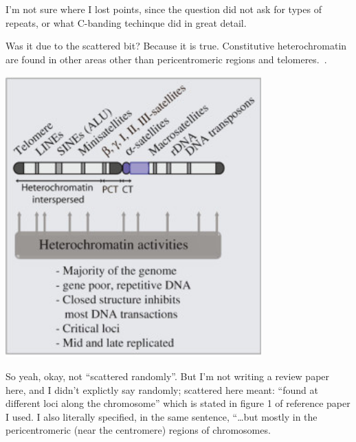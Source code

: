 \documentclass[basic,plain]{inVerba-notes}
\begin{document}
\begin{itemize}
    I'm not sure where I lost points, since the question did not ask for types of repeats, or what C-banding techinque did in great detail. 
    
    Was it due to the scattered bit? Because it is true. Constitutive heterochromatin are found in other areas other than pericentromeric regions and telomeres.~\cite{saksouk2015constitutive}. 

    \begin{center}
        \includegraphics[scale=0.5]{images/midterm-correct.png}
    \end{center}

    So yeah, okay, not ``scattered randomly''. But I'm not writing a review paper here, and I didn't explictly say randomly; scattered here meant: ``found at different loci along the chromosome'' which is stated in figure 1 of reference paper I used. I also literally specified, in the same sentence, ``\dots but mostly in the pericentromeric (near the centromere) regions of chromosomes.

\end{itemize}
\end{document}
